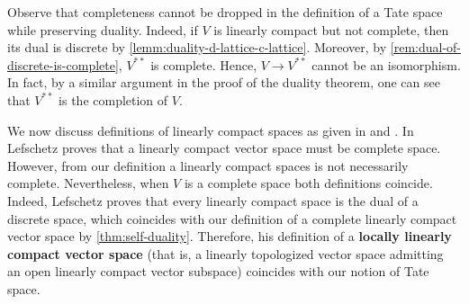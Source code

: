 \begin{remark}\label{rem:completeness-is-necessary-for-sel-duality}
	Observe that completeness cannot be dropped in the definition of a Tate space while preserving duality. Indeed, if $V$ is linearly compact but not complete, then its dual is discrete by \cref{lemm:duality-d-lattice-c-lattice}. Moreover, by \cref{rem:dual-of-discrete-is-complete}, $V^{**}$ is complete. Hence, $V \to V^{**}$ cannot be an isomorphism. In fact, by a similar argument in the proof of the duality theorem, one can see that $V^{**}$ is the completion of $V$. 
\end{remark}
\begin{remark}\label{rem:lef-vs-beilinson}
	We now discuss definitions of linearly compact spaces as given in \cite{Lefschetz-Alg-Top} and \cite{Chiral}. In \cite{Lefschetz-Alg-Top} Lefschetz proves that a linearly compact vector space must be complete space. However, from our definition a linearly compact spaces is not necessarily complete. Nevertheless, when $V$ is a complete space both definitions coincide. Indeed, Lefschetz proves that every linearly compact space is the dual of a discrete space, which coincides with our definition of a complete linearly compact vector space by \cref{thm:self-duality}. Therefore, his definition of a \textbf{locally linearly compact vector space} (that is, a linearly topologized vector space admitting an open linearly compact vector subspace) coincides with our notion of Tate space.
\end{remark}
